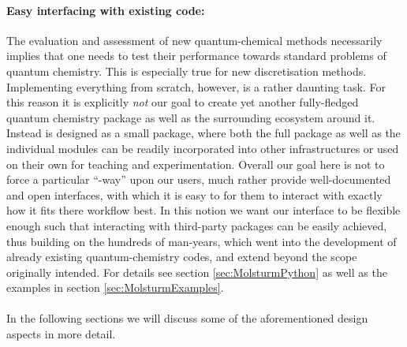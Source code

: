 \paragraph{Easy interfacing with existing code:}
The evaluation and assessment of new quantum-chemical methods
necessarily implies that one needs to test their performance
towards standard problems of quantum chemistry.
This is especially true for new discretisation methods.
Implementing everything from scratch,
however, is a rather daunting task.
For this reason it is explicitly \emph{not} our goal
to create yet another fully-fledged quantum chemistry package
as well as the surrounding ecosystem around it.
Instead \molsturm is designed as a small package,
where both the full package as well as the individual modules
can be readily incorporated into other infrastructures
or used on their own for teaching and experimentation.
Overall our goal here is not to force a particular ``\molsturm-way'' upon
our users,
much rather provide well-documented and open interfaces,
with which it is easy to for them to interact with \molsturm
exactly how it fits there workflow best.
In this notion we want our \molsturm interface
to be flexible enough such that interacting
with third-party packages can be easily achieved,
thus building on the hundreds of man-years,
which went into the development of already existing quantum-chemistry codes,
and extend \molsturm beyond the scope originally intended.
For details see section \vref{sec:MolsturmPython}
as well as the examples in section \vref{sec:MolsturmExamples}.
%
%
\paragraph*{}
In the following sections we will discuss some of the
aforementioned design aspects in more detail.

